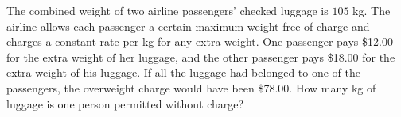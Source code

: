 The combined weight of two airline passengers' checked luggage is $105$ kg. The airline allows each passenger a certain maximum weight free of charge and charges a constant rate per kg for any extra weight. One passenger pays \$12.00 for the extra weight of her luggage, and the other passenger pays \$18.00 for the extra weight of his luggage. If all the luggage had belonged to one of the passengers, the overweight charge would have been \$78.00. How many kg of luggage is one person permitted without charge?
